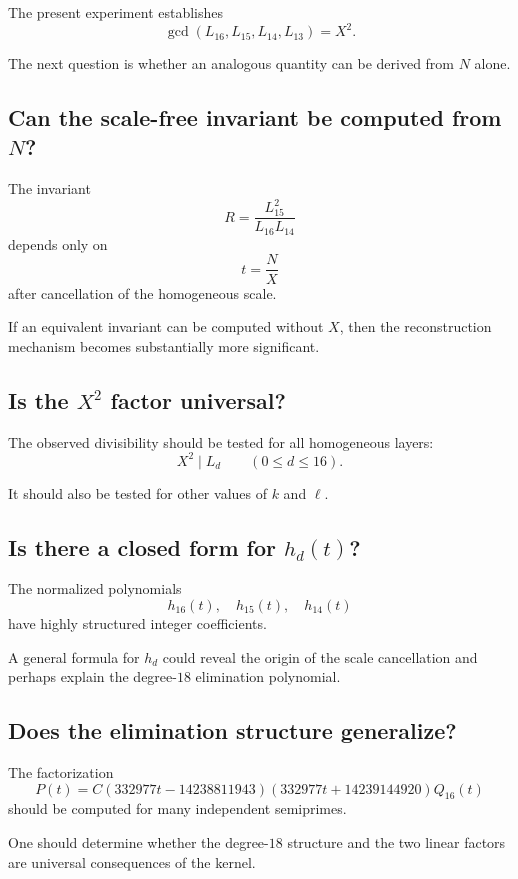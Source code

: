 \documentclass[11pt,a4paper]{article}
\theoremstyle{definition}
\theoremstyle{remark}
\newcommand{\gcdx}{\operatorname{gcd}}
\begin{document}
The present experiment establishes
\[
\gcdx(L_{16},L_{15},L_{14},L_{13})=X^2.
\]

The next question is whether an analogous quantity can be derived from
$N$ alone.

\subsection{Can the scale-free invariant be computed from $N$?}

The invariant
\[
R=\frac{L_{15}^2}{L_{16}L_{14}}
\]
depends only on
\[
t=\frac{N}{X}
\]
after cancellation of the homogeneous scale.

If an equivalent invariant can be computed without $X$, then the
reconstruction mechanism becomes substantially more significant.

\subsection{Is the $X^2$ factor universal?}

The observed divisibility should be tested for all homogeneous layers:
\[
X^2\mid L_d
\qquad
(0\leq d\leq16).
\]

It should also be tested for other values of $k$ and $\ell$.

\subsection{Is there a closed form for $h_d(t)$?}

The normalized polynomials
\[
h_{16}(t),\quad h_{15}(t),\quad h_{14}(t)
\]
have highly structured integer coefficients.

A general formula for $h_d$ could reveal the origin of the scale cancellation
and perhaps explain the degree-$18$ elimination polynomial.

\subsection{Does the elimination structure generalize?}

The factorization
\[
P(t)
=
C
(332977t-14238811943)
(332977t+14239144920)
Q_{16}(t)
\]
should be computed for many independent semiprimes.

One should determine whether the degree-$18$ structure and the two
linear factors are universal consequences of the kernel.

\end{document}
